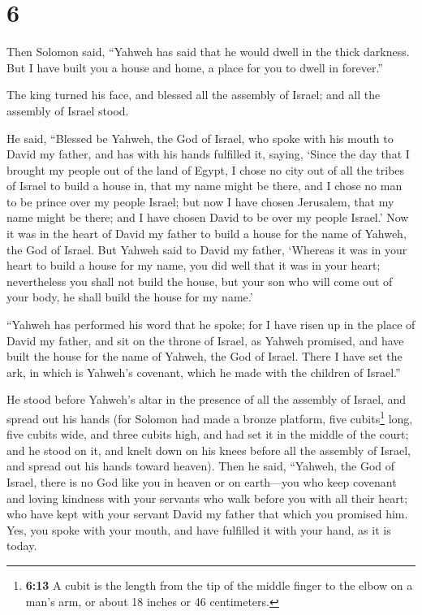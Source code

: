 \hypertarget{section-5}{%
\section{6}\label{section-5}}

 Then Solomon said, ``Yahweh has said that he would dwell
in the thick darkness.  But I have built you a house and
home, a place for you to dwell in forever.''

 The king turned his face, and blessed all the assembly of
Israel; and all the assembly of Israel stood.

 He said, ``Blessed be Yahweh, the God of Israel, who
spoke with his mouth to David my father, and has with his hands
fulfilled it, saying,  `Since the day that I brought my
people out of the land of Egypt, I chose no city out of all the tribes
of Israel to build a house in, that my name might be there, and I chose
no man to be prince over my people Israel;  but now I have
chosen Jerusalem, that my name might be there; and I have chosen David
to be over my people Israel.'  Now it was in the heart of
David my father to build a house for the name of Yahweh, the God of
Israel.  But Yahweh said to David my father, `Whereas it
was in your heart to build a house for my name, you did well that it was
in your heart;  nevertheless you shall not build the
house, but your son who will come out of your body, he shall build the
house for my name.'

 ``Yahweh has performed his word that he spoke; for I
have risen up in the place of David my father, and sit on the throne of
Israel, as Yahweh promised, and have built the house for the name of
Yahweh, the God of Israel.  There I have set the ark, in
which is Yahweh's covenant, which he made with the children of Israel.''

 He stood before Yahweh's altar in the presence of all
the assembly of Israel, and spread out his hands  (for
Solomon had made a bronze platform, five cubits\footnote{\textbf{6:13} A
  cubit is the length from the tip of the middle finger to the elbow on
  a man's arm, or about 18 inches or 46 centimeters.} long, five cubits
wide, and three cubits high, and had set it in the middle of the court;
and he stood on it, and knelt down on his knees before all the assembly
of Israel, and spread out his hands toward heaven).  Then
he said, ``Yahweh, the God of Israel, there is no God like you in heaven
or on earth---you who keep covenant and loving kindness with your
servants who walk before you with all their heart;  who
have kept with your servant David my father that which you promised him.
Yes, you spoke with your mouth, and have fulfilled it with your hand, as
it is today.

